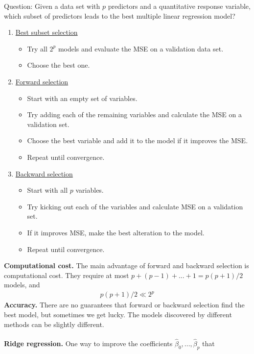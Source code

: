 \documentclass[12pt, letterpaper]{article}
\begin{document}
\noindent Question: Given a data set with $p$ predictors and a quantitative response variable, which subset of 
predictors leads to the best multiple linear regression model?
\begin{enumerate}
    \item \underline{Best subset selection}
    \begin{itemize}
        \item Try all $2^p$ models and evaluate the MSE on a validation data set.
        \item Choose the best one.
    \end{itemize}
    \item \underline{Forward selection}
    \begin{itemize}
        \item Start with an empty set of variables.
        \item Try adding each of the remaining variables and calculate the MSE on a validation set.
        \item Choose the best variable and add it to the model if it improves the MSE.
        \item Repeat until convergence.
    \end{itemize}
    \item \underline{Backward selection}
    \begin{itemize}
        \item Start with all $p$ variables.
        \item Try kicking out each of the variables and calculate MSE on a validation set.
        \item If it improves MSE, make the best alteration to the model.
        \item Repeat until convergence.
    \end{itemize}
\end{enumerate}
\textbf{Computational cost.} The main advantage of forward and backward selection is computational cost.
They require at most $p+(p-1)+...+1 = p(p+1)/2$ models, and 
\begin{align*}
    p(p+1)/2 \ll 2^p
\end{align*}
\textbf{Accuracy.} There are no guarantees that forward or backward selection find the best model,
but sometimes we get lucky. The models discovered by different methods can be slightly different. \\ \\
\textbf{Ridge regression.} One way to improve the coefficients $\hat \beta_0,..., \hat \beta_p$ that
\end{document}
